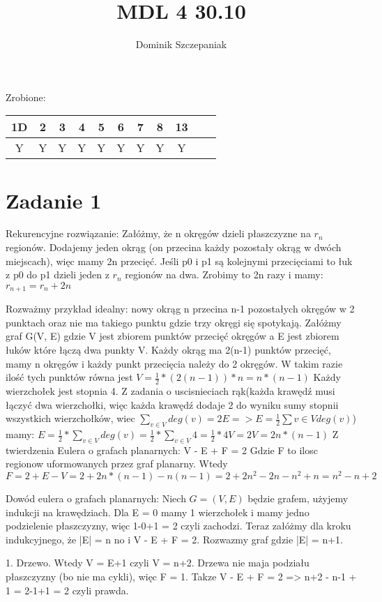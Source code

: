 \documentclass[12pt]{article}
\title{MDL 4 30.10}
\author{Dominik Szczepaniak}
\begin{document}
\maketitle
Zrobione:
\begin{tabular}{|| c c c c c c c c c c c||}
    \hline
    1D & 2 & 3 & 4 & 5 & 6 & 7 & 8 & 13  \\
    \hline
    Y & Y & Y & Y & Y & Y & Y & Y & Y
\end{tabular}

\bgroup\obeylines

\section{Zadanie 1}
Rekurencyjne rozwiązanie:
Załóżmy, że n okręgów dzieli płaszczyzne na $r_n$ regionów. Dodajemy jeden okrąg (on przecina każdy pozostały okrąg w dwóch miejscach), więc mamy 2n przecięć. Jeśli p0 i p1 są kolejnymi przecięciami to łuk z p0 do p1 dzieli jeden z $r_n$ regionów na dwa. Zrobimy to 2n razy i mamy:
$r_{n+1} = r_n + 2n$


Rozważmy przykład idealny: nowy okrąg n przecina n-1 pozostałych okręgów w 2 punktach oraz nie ma takiego punktu gdzie trzy okręgi się spotykają. Załóżmy graf G(V, E) gdzie V jest zbiorem punktów przecięć okręgów a E jest zbiorem łuków które łączą dwa punkty V. 
Każdy okrąg ma 2(n-1) punktów przecięć, mamy n okręgów i każdy punkt przecięcia należy do 2 okręgów. W takim razie ilość tych punktów równa jest
$V = \frac{1}{2}*(2(n-1))*n = n*(n-1)$
Każdy wierzchołek jest stopnia 4. Z zadania o uscisnieciach rąk(każda krawędź musi łączyć dwa wierzchołki, więc każda krawędź dodaje 2 do wyniku sumy stopnii wszystkich wierzchołków, wiec $\sum_{v \in V}{} deg(v) = 2E => E = \frac{1}{2} \sum{v \in V}{} deg(v)$) mamy:
$E = \frac{1}{2} * \sum_{v \in V}{} deg(v) = \frac{1}{2} * \sum_{v \in V}{} 4 = \frac{1}{2} * 4V = 2V = 2n*(n-1)$
Z twierdzenia Eulera o grafach planarnych:
V - E + F = 2
Gdzie F to ilosc regionow uformowanych przez graf planarny. Wtedy
$F = 2 + E - V = 2 + 2n*(n-1) - n(n-1) = 2 + 2n^2 - 2n - n^2 + n = n^2 - n + 2$

Dowód eulera o grafach planarnych:
Niech $G = (V,E)$ będzie grafem, użyjemy indukcji na krawędziach. Dla E = 0 mamy 1 wierzchołek i mamy jedno podzielenie płaszczyzny, więc 1-0+1 = 2 czyli zachodzi. Teraz załóżmy dla kroku indukcyjnego, że |E| = n no i V - E + F = 2. Rozwazmy graf gdzie |E| = n+1.

1. Drzewo. Wtedy V = E+1 czyli V = n+2. Drzewa nie maja podziału płaszczyzny (bo nie ma cykli), więc F = 1.
Takze V - E + F = 2 => n+2 - n-1 + 1 = 2-1+1 = 2 czyli prawda.
\end{document}
